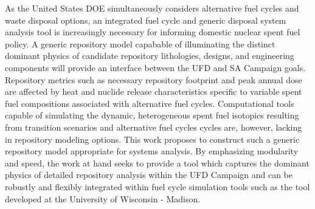 As the United States \gls{DOE} simultaneously considers alternative fuel cycles 
and waste disposal options, an integrated fuel cycle and generic disposal system 
analysis tool is increasingly necessary for informing domestic nuclear spent 
fuel policy. A generic repository model capabable of illuminating the distinct 
dominant physics of candidate repository lithologies, designs, and engineering 
components will provide an interface between the \gls{UFD} and \gls{SA} Campaign 
goals. Repository metrics such as necessary repository footprint and peak annual 
dose are affected by heat and nuclide release characteristics specific to 
variable spent fuel compositions associated  with alternative fuel cycles. 
Computational tools capable of simulating the dynamic, heterogeneous spent fuel 
isotopics resulting from transition scenarios and alternative fuel cycles cycles 
are, however, lacking in repository modeling  options. This work proposes to 
construct such a generic repository model appropriate for systems analysis. By 
emphasizing modularity and speed, the work at hand seeks to  provide a tool 
which captures the dominant physics of detailed repository analysis within the 
\gls{UFD} Campaign and can be robustly and flexibly integrated within fuel cycle 
simulation tools such as the \Cyclus tool developed at the University of 
Wisconsin - Madison.


\glsresetall
